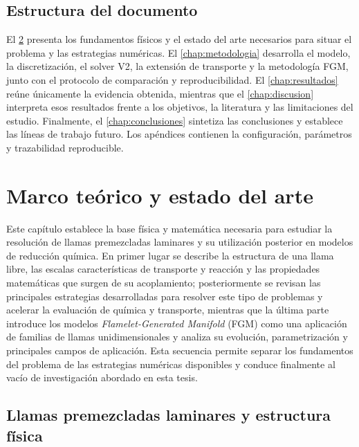 \documentclass[12pt,a4paper,twoside,openany]{book}
\newcommand{\Vdos}{\textsc{V2}\xspace}
\begin{document}
\section{Estructura del documento}

El \cref{chap:marco-teorico} presenta los fundamentos físicos y el estado del
arte necesarios para situar el problema y las estrategias numéricas. El
\cref{chap:metodologia} desarrolla el modelo, la discretización, el solver
\Vdos, la extensión de transporte y la metodología FGM, junto con el protocolo
de comparación y reproducibilidad. El \cref{chap:resultados} reúne únicamente
la evidencia obtenida, mientras que el \cref{chap:discusion} interpreta esos
resultados frente a los objetivos, la literatura y las limitaciones del estudio.
Finalmente, el \cref{chap:conclusiones} sintetiza las conclusiones y establece
las líneas de trabajo futuro. Los apéndices contienen la configuración,
parámetros y trazabilidad reproducible.

\chapter{Marco teórico y estado del arte}
\label{chap:marco-teorico}

Este capítulo establece la base física y matemática necesaria para estudiar la
resolución de llamas premezcladas laminares y su utilización posterior en
modelos de reducción química. En primer lugar se describe la estructura de una
llama libre, las escalas características de transporte y reacción y las
propiedades matemáticas que surgen de su acoplamiento; posteriormente se revisan
las principales estrategias desarrolladas para resolver este tipo de problemas
y acelerar la evaluación de química y transporte, mientras que la última parte
introduce los modelos \emph{Flamelet-Generated Manifold} (FGM) como una
aplicación de familias de llamas unidimensionales y analiza su evolución,
parametrización y principales campos de aplicación. Esta secuencia permite
separar los fundamentos del problema de las estrategias numéricas disponibles y
conduce finalmente al vacío de investigación abordado en esta tesis.


\section{Llamas premezcladas laminares y estructura física}
\label{sec:premixed-laminar-flames}
\end{document}
